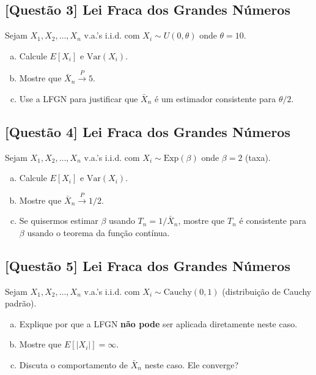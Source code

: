 \documentclass[12pt,a4paper]{article}
\begin{document}
\subsection*{[Questão 3] Lei Fraca dos Grandes Números}

Sejam $X_1, X_2, \ldots, X_n$ v.a.'s i.i.d. com $X_i \sim U(0, \theta)$ onde $\theta = 10$.

\begin{enumerate}[(a)]
    \item Calcule $E[X_i]$ e $\text{Var}(X_i)$.
    \item Mostre que $\bar{X}_n \xrightarrow{P} 5$.
    \item Use a LFGN para justificar que $\bar{X}_n$ é um estimador consistente para $\theta/2$.
\end{enumerate}

\subsection*{[Questão 4] Lei Fraca dos Grandes Números}

Sejam $X_1, X_2, \ldots, X_n$ v.a.'s i.i.d. com $X_i \sim \text{Exp}(\beta)$ onde $\beta = 2$ (taxa).

\begin{enumerate}[(a)]
    \item Calcule $E[X_i]$ e $\text{Var}(X_i)$.
    \item Mostre que $\bar{X}_n \xrightarrow{P} 1/2$.
    \item Se quisermos estimar $\beta$ usando $T_n = 1/\bar{X}_n$, mostre que $T_n$ é consistente para $\beta$ usando o teorema da função contínua.
\end{enumerate}

\subsection*{[Questão 5] Lei Fraca dos Grandes Números}

Sejam $X_1, X_2, \ldots, X_n$ v.a.'s i.i.d. com $X_i \sim \text{Cauchy}(0, 1)$ (distribuição de Cauchy padrão).

\begin{enumerate}[(a)]
    \item Explique por que a LFGN \textbf{não pode} ser aplicada diretamente neste caso.
    \item Mostre que $E[|X_i|] = \infty$.
    \item Discuta o comportamento de $\bar{X}_n$ neste caso. Ele converge?
\end{enumerate}
\end{document}
